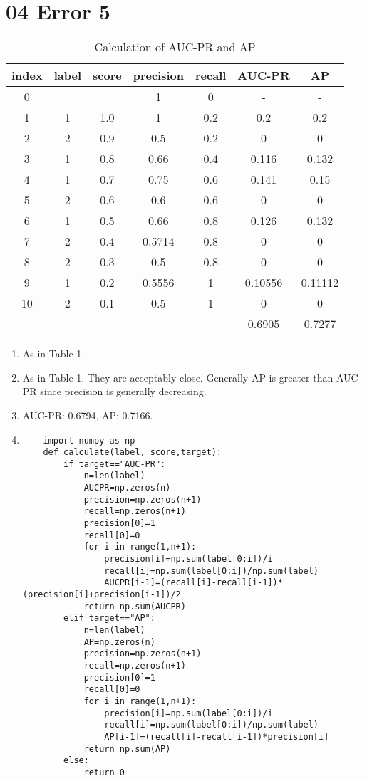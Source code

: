 \documentclass[10pt, oneside]{article}
\begin{document}
\section{04 Error 5}
 \begin{table}
		\centering
		\label{TAB1}
		\caption{Calculation of AUC-PR and AP}
		\begin{tabular}{c c c|c c c c}
			index  & label  & score & precision  & recall & AUC-PR & AP \\ \hline
			0 &  &  & 1 & 0 & - &  -\\ 
			1 & 1 & 1.0 & 1 & 0.2 & 0.2 & 0.2 \\ 
			2 & 2 & 0.9 & 0.5 & 0.2 & 0 & 0 \\ 
			3 & 1 & 0.8 & 0.66 & 0.4 & 0.116 & 0.132 \\ 
			4 & 1 & 0.7 & 0.75 & 0.6 & 0.141 & 0.15 \\ 
			5 & 2 & 0.6 & 0.6 & 0.6 & 0 & 0 \\ 
			6 & 1 & 0.5 & 0.66 & 0.8 & 0.126 & 0.132 \\ 
			7 & 2 & 0.4 & 0.5714 & 0.8 & 0 & 0 \\ 
			8 & 2 & 0.3 & 0.5 & 0.8 & 0 & 0 \\ 
			9 & 1 & 0.2 & 0.5556 & 1 & 0.10556 & 0.11112 \\ 
			10 & 2 & 0.1 & 0.5 & 1 & 0 & 0 \\ \hline
			&  &  &  &  & 0.6905 & 0.7277 \\ 
		\end{tabular}
	\end{table}
\begin{enumerate}
	\item As in Table 1.
	\item As in Table 1. They are acceptably close. Generally AP is greater than AUC-PR since precision is generally decreasing. 
	\item AUC-PR: 0.6794, AP: 0.7166.
	\item \begin{lstlisting}
	import numpy as np
	def calculate(label, score,target):
		if target=="AUC-PR":
			n=len(label)
			AUCPR=np.zeros(n)
			precision=np.zeros(n+1)
			recall=np.zeros(n+1)
			precision[0]=1
			recall[0]=0
			for i in range(1,n+1):
				precision[i]=np.sum(label[0:i])/i
				recall[i]=np.sum(label[0:i])/np.sum(label)
				AUCPR[i-1]=(recall[i]-recall[i-1])*(precision[i]+precision[i-1])/2
			return np.sum(AUCPR)
		elif target=="AP":
			n=len(label)
			AP=np.zeros(n)
			precision=np.zeros(n+1)
			recall=np.zeros(n+1)
			precision[0]=1
			recall[0]=0
			for i in range(1,n+1):
				precision[i]=np.sum(label[0:i])/i
				recall[i]=np.sum(label[0:i])/np.sum(label)
				AP[i-1]=(recall[i]-recall[i-1])*precision[i]
			return np.sum(AP)
		else:
			return 0
	\end{lstlisting}
\end{enumerate}
\end{document}
